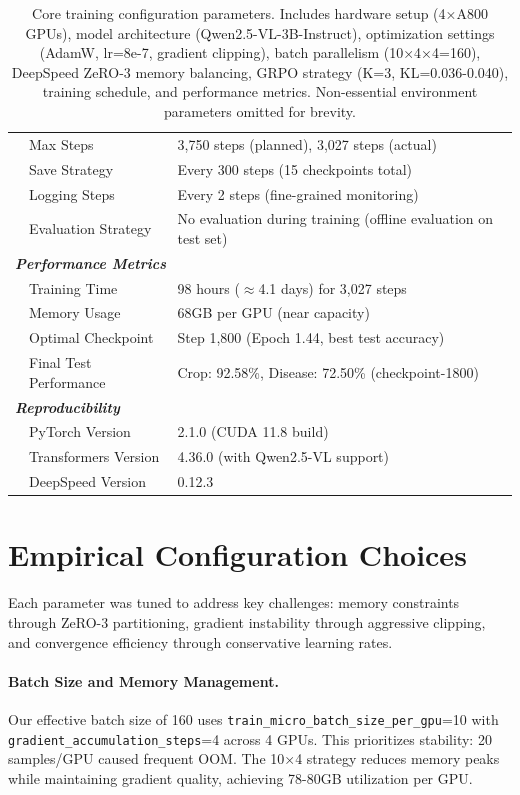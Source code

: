 \documentclass[11pt]{article}
\begin{document}
\begin{table}[t]
\begin{tabular}{llp{10cm}}
& Max Steps & 3,750 steps (planned), 3,027 steps (actual) \\
& Save Strategy & Every 300 steps (15 checkpoints total) \\
& Logging Steps & Every 2 steps (fine-grained monitoring) \\
& Evaluation Strategy & No evaluation during training (offline evaluation on test set) \\
\hline
\multicolumn{3}{l}{\textit{\textbf{Performance Metrics}}} \\
& Training Time & 98 hours ($\approx$4.1 days) for 3,027 steps \\
& Memory Usage & 68GB per GPU (near capacity) \\
& Optimal Checkpoint & Step 1,800 (Epoch 1.44, best test accuracy) \\
& Final Test Performance & Crop: 92.58\%, Disease: 72.50\% (checkpoint-1800) \\
\hline
\multicolumn{3}{l}{\textit{\textbf{Reproducibility}}} \\
& PyTorch Version & 2.1.0 (CUDA 11.8 build) \\
& Transformers Version & 4.36.0 (with Qwen2.5-VL support) \\
& DeepSpeed Version & 0.12.3 \\
\hline
\end{tabular}
\caption{Core training configuration parameters. Includes hardware setup (4×A800 GPUs), model architecture (Qwen2.5-VL-3B-Instruct), optimization settings (AdamW, lr=8e-7, gradient clipping), batch parallelism (10×4×4=160), DeepSpeed ZeRO-3 memory balancing, GRPO strategy (K=3, KL=0.036-0.040), training schedule, and performance metrics. Non-essential environment parameters omitted for brevity.}
\label{tab:training_config}
\end{table}

\section{Empirical Configuration Choices}
\label{sec:empirical_config}

Each parameter was tuned to address key challenges: memory constraints through ZeRO-3 partitioning, gradient instability through aggressive clipping, and convergence efficiency through conservative learning rates.

\paragraph{Batch Size and Memory Management.}
Our effective batch size of 160 uses \texttt{train\_micro\_batch\_size\_per\_gpu}=10 with \texttt{gradient\_accumulation\_steps}=4 across 4 GPUs. This prioritizes stability: 20 samples/GPU caused frequent OOM. The 10×4 strategy reduces memory peaks while maintaining gradient quality, achieving 78-80GB utilization per GPU.
\end{document}
